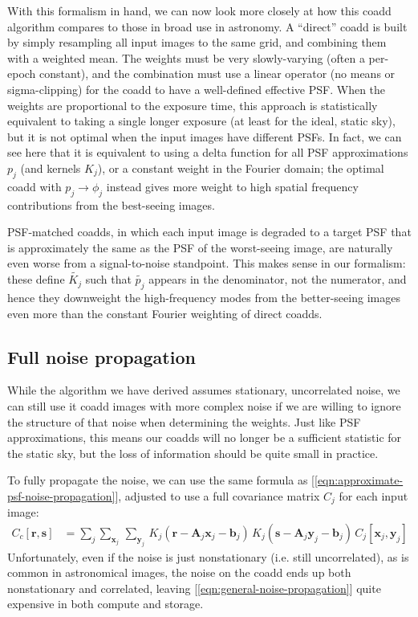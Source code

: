 \documentclass[DM,authoryear,toc]{lsstdoc}
\begin{document}
With this formalism in hand, we can now look more closely at how this coadd algorithm compares to those in broad use in astronomy.
A ``direct'' coadd is built by simply resampling all input images to the same grid, and combining them with a weighted mean.
The weights must be very slowly-varying (often a per-epoch constant), and the combination must use a linear operator (no means or sigma-clipping) for the coadd to have a well-defined effective PSF.
When the weights are proportional to the exposure time, this approach is statistically equivalent to taking a single longer exposure (at least for the ideal, static sky), but it is not optimal when the input images have different PSFs.
In fact, we can see here that it is equivalent to using a delta function for all PSF approximations $p_j$ (and kernels $K_j$), or a constant weight in the Fourier domain; the optimal coadd with $p_j \rightarrow \phi_j$ instead gives more weight to high spatial frequency contributions from the best-seeing images.

PSF-matched coadds, in which each input image is degraded to a target PSF that is approximately the same as the PSF of the worst-seeing image, are naturally even worse from a signal-to-noise standpoint.
This makes sense in our formalism: these define $\widetilde{K_j}$ such that $\widetilde{p_j}$ appears in the denominator, not the numerator, and hence they downweight the high-frequency modes from the better-seeing images even more than the constant Fourier weighting of direct coadds.

\subsection{Full noise propagation}

While the algorithm we have derived assumes stationary, uncorrelated noise, we can still use it coadd images with more complex noise if we are willing to ignore the structure of that noise when determining the weights.
Just like PSF approximations, this means our coadds will no longer be a sufficient statistic for the static sky, but the loss of information should be quite small in practice.

To fully propagate the noise, we can use the same formula as [\ref{eqn:approximate-psf-noise-propagation}], adjusted to use a full covariance matrix $C_j$ for each input image:
\begin{align}
    C_c\!\left[\symbf{r}, \symbf{s}\right] &= \sum_j \sum_{\symbf{x}_j} \, \sum_{\symbf{y}_j} \,
        K_j\!\left(\symbf{r} - \symbf{A}_j\symbf{x}_j - \symbf{b}_j\right) \,
        K_j\!\left(\symbf{s} - \symbf{A}_j\symbf{y}_j - \symbf{b}_j\right) \,
        C_j\!\left[\symbf{x}_j, \symbf{y}_j\right]
    \label{eqn:general-noise-propagation}
\end{align}
Unfortunately, even if the noise is just nonstationary (i.e. still uncorrelated), as is common in astronomical images, the noise on the coadd ends up both nonstationary and correlated, leaving [\ref{eqn:general-noise-propagation}] quite expensive in both compute and storage.
\end{document}
